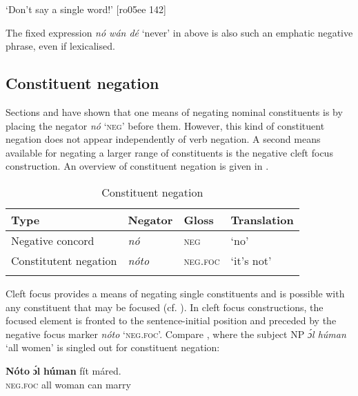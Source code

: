 \glt ‘Don’t say a single word!’ [ro05ee 142]
\z

The fixed expression \textit{nó wán dé} ‘never’ in  above is also such an emphatic negative phrase, even if lexicalised. 

\subsection{Constituent negation}\label{sec:7.2.4}

Sections  and  have shown that one means of negating nominal constituents is by placing the negator \textit{nó} ‘\textsc{neg}’ before them. However, this kind of constituent negation does not appear independently of verb negation. A second means available for negating a larger range of constituents is the negative cleft focus construction. An overview of constituent negation is given in . 

\begin{table}
\caption{Constituent negation}
\label{tab:key:7.3}

\begin{tabularx}{\textwidth}{lXXX}
\lsptoprule
Type & Negator & Gloss & Translation\\
\midrule 
Negative concord & \itshape nó & \textsc{neg} & ‘no’\\
Constitutent negation & \itshape nóto & \textsc{neg}.\textsc{foc} & ‘it’s not’\\
\lspbottomrule
\end{tabularx}
\end{table}

Cleft focus provides a means of negating single constituents and is possible with any constituent that may be focused (cf. ). In cleft focus constructions, the focused element is fronted to the sentence-initial position and preceded by the negative focus marker \textit{nóto} ‘\textsc{neg}.\textsc{foc}’. Compare , where the subject \textsc{NP} \textit{ɔ́l húman} ‘all women’ is singled out for constituent negation:


\ea%
    \label{ex:key:576}
    \gll \textbf{Nóto}  \textbf{ɔ́l}  \textbf{húman}  fít  máred.\\
\textsc{neg}.\textsc{foc}  all  woman  can  marry\\

